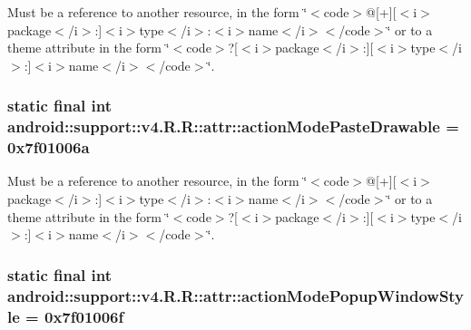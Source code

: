 Must be a reference to another resource, in the form \char`\"{}$<$code$>$@\mbox{[}+\mbox{]}\mbox{[}$<$i$>$package$<$/i$>$:\mbox{]}$<$i$>$type$<$/i$>$:$<$i$>$name$<$/i$>$$<$/code$>$\char`\"{} or to a theme attribute in the form \char`\"{}$<$code$>$?\mbox{[}$<$i$>$package$<$/i$>$:\mbox{]}\mbox{[}$<$i$>$type$<$/i$>$:\mbox{]}$<$i$>$name$<$/i$>$$<$/code$>$\char`\"{}. \hypertarget{classandroid_1_1support_1_1v4_1_1_r_1_1attr_b7d90b95ada44484214f96b068480f72}{
\subsubsection[{actionModePasteDrawable}]{\setlength{\rightskip}{0pt plus 5cm}static final int android::support::v4.R.R::attr::actionModePasteDrawable = 0x7f01006a}}
\label{classandroid_1_1support_1_1v4_1_1_r_1_1attr_b7d90b95ada44484214f96b068480f72}


Must be a reference to another resource, in the form \char`\"{}$<$code$>$@\mbox{[}+\mbox{]}\mbox{[}$<$i$>$package$<$/i$>$:\mbox{]}$<$i$>$type$<$/i$>$:$<$i$>$name$<$/i$>$$<$/code$>$\char`\"{} or to a theme attribute in the form \char`\"{}$<$code$>$?\mbox{[}$<$i$>$package$<$/i$>$:\mbox{]}\mbox{[}$<$i$>$type$<$/i$>$:\mbox{]}$<$i$>$name$<$/i$>$$<$/code$>$\char`\"{}. \hypertarget{classandroid_1_1support_1_1v4_1_1_r_1_1attr_c3483400b7248477261c8d555ffa2d09}{
\subsubsection[{actionModePopupWindowStyle}]{\setlength{\rightskip}{0pt plus 5cm}static final int android::support::v4.R.R::attr::actionModePopupWindowStyle = 0x7f01006f}}
\label{classandroid_1_1support_1_1v4_1_1_r_1_1attr_c3483400b7248477261c8d555ffa2d09}


